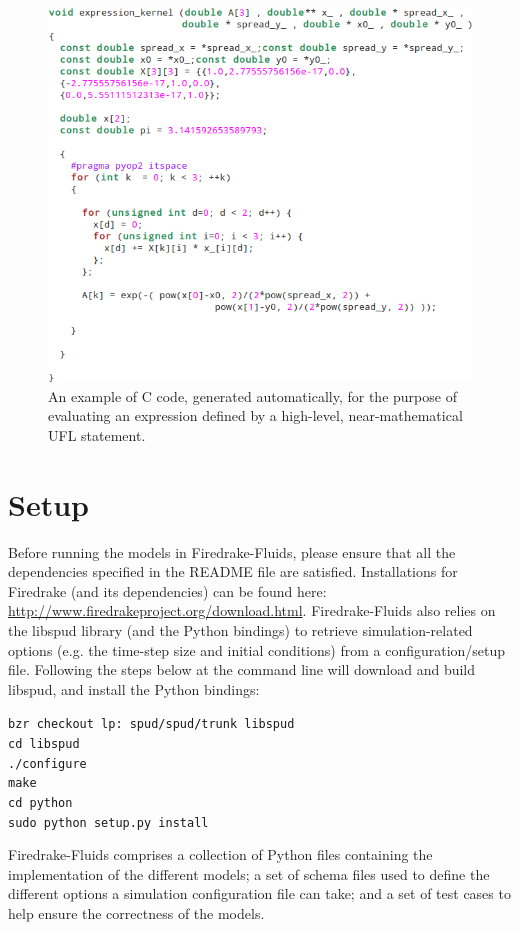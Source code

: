 \documentclass[a4paper,11pt]{report}
\begin{document}
\begin{figure}
   \centering
   \includegraphics[width=0.75\columnwidth]{images/c_kernel.png}
   \caption{An example of C code, generated automatically, for the purpose of evaluating an expression defined by a high-level, near-mathematical UFL statement.}
   \label{fig:c_kernel}
\end{figure}

\section{Setup}
Before running the models in Firedrake-Fluids, please ensure that all the dependencies specified in the README file are satisfied. Installations for Firedrake (and its dependencies) can be found here: \url{http://www.firedrakeproject.org/download.html}. Firedrake-Fluids also relies on the libspud library (and the Python bindings) to retrieve simulation-related options (e.g. the time-step size and initial conditions) from a configuration/setup file. Following the steps below at the command line will download and build libspud, and install the Python bindings:

\texttt{bzr checkout lp:~spud/spud/trunk libspud}\\
\texttt{cd libspud}\\
\texttt{./configure}\\
\texttt{make}\\
\texttt{cd python}\\
\texttt{sudo python setup.py install}

Firedrake-Fluids comprises a collection of Python files containing the implementation of the different models; a set of schema files used to define the different options a simulation configuration file can take; and a set of test cases to help ensure the correctness of the models.
\end{document}
